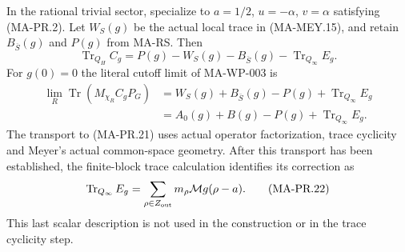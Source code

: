 In the rational trivial sector, specialize to $a=1/2$,
$u=-\alpha$, $v=\alpha$ satisfying (MA-PR.2).
Let $W_S(g)$ be the actual local trace in (MA-MEY.15),
and retain $B_{\overline S}(g)$ and $P(g)$ from MA-RS.
Then
\[
 \operatorname{Tr}_{Q_H}C_g
      =P(g)-W_S(g)-B_{\overline S}(g)
                            -\operatorname{Tr}_{Q_\infty}E_g .
\tag{MA-PR.20}
\]
For $g(0)=0$ the literal cutoff limit of MA-WP-003 is
\[
\begin{aligned}
 \lim_R\operatorname{Tr}(M_{\chi_R}C_gP_G)
    &=W_S(g)+B_{\overline S}(g)-P(g)
                           +\operatorname{Tr}_{Q_\infty}E_g\\
    &=A_0(g)+B(g)-P(g)
                           +\operatorname{Tr}_{Q_\infty}E_g .
\end{aligned}
\tag{MA-PR.21}
\]
The transport to (MA-PR.21) uses actual operator
factorization, trace cyclicity and Meyer's actual
common-space geometry.  After this transport has
been established, the finite-block trace calculation
identifies its correction as
\[
 \operatorname{Tr}_{Q_\infty}E_g
       =\sum_{\rho\in Z_{\rm out}}
                         m_\rho\mathcal Mg(\rho-a).
\tag{MA-PR.22}
\]
This last scalar description is not used in the
construction or in the trace cyclicity step.

